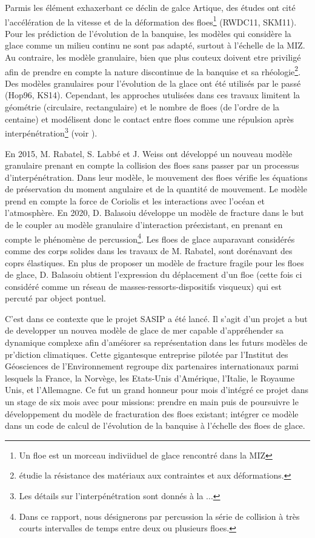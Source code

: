 Parmis les élément exhaxerbant ce déclin de galce Artique, des études ont cité l'accélération de la vitesse et de la déformation des floes\footnote{Un floe est un morceau indiviiduel de glace rencontré dans la MIZ} (RWDC11, SKM11). Pour les prédiction de l'évolution de la banquise, les modèles qui considère la glace comme un milieu continu ne sont pas adapté, surtout à l'échelle de la MIZ. Au contraire, les modèle granulaire, bien que plus couteux doivent etre priviligé afin de prendre en compte la nature discontinue de la banquise et sa rhéologie\footnote{étudie la résistance des matériaux aux contraintes et aux déformations.}. Des modèles granulaires pour l'évolution de la glace ont été utilisés par le passé (Hop96, KS14). Cependant, les approches utulisées dans ces travaux limitent la géométrie (circulaire, rectangulaire) et le nombre de floes (de l'ordre de la centaine) et modélisent donc le contact entre floes comme une répulsion après interpénétration\footnote{Les détails sur l'interpénétration sont donnés à la ... } (voir \parencite[p.16]{balasoiu2020halthesis}). 

En 2015, M. Rabatel, S. Labbé et J. Weiss \parencite{rabatel2015dynamics,rabatel2015thesis} ont développé un nouveau modèle granulaire prenant en compte la collision des floes sans passer par un processus d’interpénétration. Dans leur modèle, le mouvement des floes vérifie les équations de préservation du moment angulaire et de la quantité de mouvement. Le modèle prend en compte la force de Coriolis et les interactions avec l’océan et l’atmosphère. En 2020, D. Balasoiu \parencite{balasoiu2020halthesis} développe un modèle de fracture dans le but de le coupler au modèle granulaire d'interaction préexistant, en prenant en compte le phénomène de percussion\footnote{Dans ce rapport, nous désignerons par percussion la série de collision à très courts intervalles de temps entre deux ou plusieurs floes.}. Les floes de glace auparavant considérés comme des corps solides dans les travaux de M. Rabatel, sont dorénavant des coprs élastiques. En plus de proposer un modèle de fracture fragile pour les floes de glace, D. Balasoiu obtient l’expression du déplacement d'un floe (cette fois ci considéré comme un réseau de masses-ressorts-dispositifs visqueux) qui est percuté par object pontuel.

C'est dans ce contexte que le projet SASIP a été lancé. Il s'agit d'un projet a but de developper un nouvea modèle de glace de mer capable d'appréhender sa dynamique complexe afin d'améiorer sa représentation dans les futurs modèles de pr'diction climatiques. Cette gigantesque entreprise pilotée par l'Institut des Géosciences de l'Environnement regroupe dix partenaires internationaux parmi lesquels la France, la Norvège, les Etats-Unis d'Amérique, l'Italie, le Royaume Unis, et l'Allemagne. Ce fut un grand honneur pour mois d'intégré ce projet dans un stage de six mois avec pour missions: prendre en main puis de poursuivre le développement du modèle de fracturation des floes existant; intégrer ce modèle dans un code de calcul de l’évolution de la banquise à l’échelle des floes de glace.


